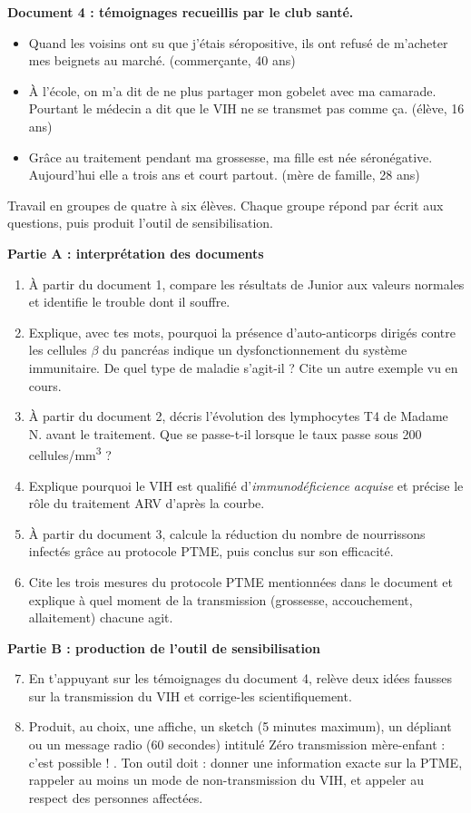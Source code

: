 \documentclass[11pt]{article}
\newcounter{popsec}
\newcounter{popsub}
\newcommand{\courssub}[1]{%
  \stepcounter{popsub}%
  \par\vspace{9pt}\noindent{\popxbold\fontsize{11.5}{13}\selectfont\color{popink}{\color{poporange}\thepopsec.\thepopsub}\hspace{6pt}#1}\par\nopagebreak\vspace{4pt}
}
\begin{document}
\textbf{Document 4 : témoignages recueillis par le club santé.}
\begin{itemize}
\item \og Quand les voisins ont su que j'étais séropositive, ils ont refusé de m'acheter mes beignets au marché. \fg{} (commerçante, 40 ans)
\item \og À l'école, on m'a dit de ne plus partager mon gobelet avec ma camarade. Pourtant le médecin a dit que le VIH ne se transmet pas comme ça. \fg{} (élève, 16 ans)
\item \og Grâce au traitement pendant ma grossesse, ma fille est née séronégative. Aujourd'hui elle a trois ans et court partout. \fg{} (mère de famille, 28 ans)
\end{itemize}

\courssub{Consignes}

Travail en groupes de quatre à six élèves. Chaque groupe répond par écrit aux questions, puis produit l'outil de sensibilisation.

\textbf{Partie A : interprétation des documents}
\begin{enumerate}
\item À partir du document 1, compare les résultats de Junior aux valeurs normales et identifie le trouble dont il souffre.
\item Explique, avec tes mots, pourquoi la présence d'auto-anticorps dirigés contre les cellules $\beta$ du pancréas indique un dysfonctionnement du système immunitaire. De quel type de maladie s'agit-il ? Cite un autre exemple vu en cours.
\item À partir du document 2, décris l'évolution des lymphocytes T4 de Madame N. avant le traitement. Que se passe-t-il lorsque le taux passe sous 200 cellules/mm\textsuperscript{3} ?
\item Explique pourquoi le VIH est qualifié d'\emph{immunodéficience acquise} et précise le rôle du traitement ARV d'après la courbe.
\item À partir du document 3, calcule la réduction du nombre de nourrissons infectés grâce au protocole PTME, puis conclus sur son efficacité.
\item Cite les trois mesures du protocole PTME mentionnées dans le document et explique à quel moment de la transmission (grossesse, accouchement, allaitement) chacune agit.
\end{enumerate}

\textbf{Partie B : production de l'outil de sensibilisation}
\begin{enumerate}
\setcounter{enumi}{6}
\item En t'appuyant sur les témoignages du document 4, relève deux idées fausses sur la transmission du VIH et corrige-les scientifiquement.
\item Produit, au choix, une affiche, un sketch (5 minutes maximum), un dépliant ou un message radio (60 secondes) intitulé \og Zéro transmission mère-enfant : c'est possible ! \fg. Ton outil doit : donner une information exacte sur la PTME, rappeler au moins un mode de non-transmission du VIH, et appeler au respect des personnes affectées.
\end{enumerate}
\end{document}
